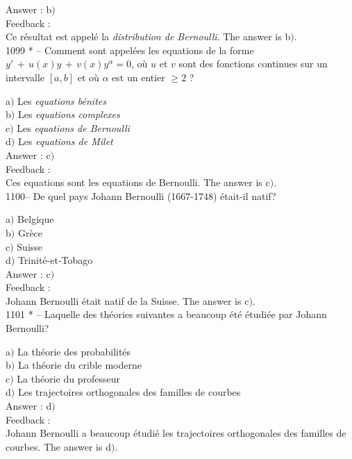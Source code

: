 \documentclass[letterpaper, 12pt]{article}
\begin{document}
Answer : b$)$\\

Feedback : \\
Ce r\'esultat est appel\'e la {\sl distribution de Bernoulli}.
The answer is b$)$.\\

1099 * -- Comment sont appel\'ees les equations de la forme
$y'\,+\,u(x)y\,+\,v(x)y^{\alpha}=0$, o\`u $u$ et $v$ sont des
fonctions continues sur un intervalle $[a,b]$ et o\`u $\alpha$ est
un entier $\ge2$ ?

a$)$ Les {\sl equations b\'enites} \\
b$)$ Les {\sl equations complexes}  \\
c$)$ Les {\sl equations de Bernoulli}  \\
d$)$ Les {\sl equations de Milet}\\

Answer : c$)$\\

Feedback : \\
Ces equations sont les equations de Bernoulli.
The answer is c$)$.\\

1100-- De quel pays Johann Bernoulli (1667-1748) \'etait-il natif?

a$)$ Belgique \\
b$)$ Gr\`ece  \\
c$)$ Suisse  \\
d$)$ Trinit\'e-et-Tobago \\

Answer : c$)$\\

Feedback : \\
Johann Bernoulli \'etait natif de la Suisse.
The answer is c$)$.\\

1101 * -- Laquelle des th\'eories suivantes a beaucoup \'et\'e
\'etudi\'ee par Johann Bernoulli?

a$)$ La th\'eorie des probabilit\'es \\
b$)$ La th\'eorie du crible moderne  \\
c$)$ La th\'eorie du professeur  \\
d$)$ Les trajectoires orthogonales des familles de courbes\\

Answer : d$)$\\

Feedback : \\
Johann Bernoulli a beaucoup \'etudi\'e les trajectoires orthogonales
des familles de courbes.
The answer is d$)$.\\
\end{document}
